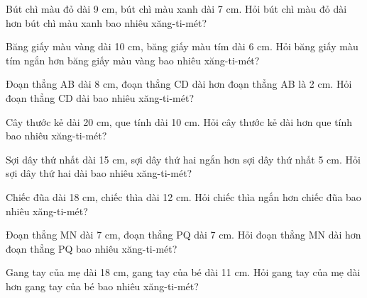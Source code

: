 \begin{ex}
Bút chì màu đỏ dài 9 cm, bút chì màu xanh dài 7 cm. Hỏi bút chì màu đỏ dài hơn bút chì màu xanh bao nhiêu xăng-ti-mét?
\end{ex}

\begin{ex}
Băng giấy màu vàng dài 10 cm, băng giấy màu tím dài 6 cm. Hỏi băng giấy màu tím ngắn hơn băng giấy màu vàng bao nhiêu xăng-ti-mét?
\end{ex}

\begin{ex}
Đoạn thẳng AB dài 8 cm, đoạn thẳng CD dài hơn đoạn thẳng AB là 2 cm. Hỏi đoạn thẳng CD dài bao nhiêu xăng-ti-mét?
\end{ex}

\begin{ex}
Cây thước kẻ dài 20 cm, que tính dài 10 cm. Hỏi cây thước kẻ dài hơn que tính bao nhiêu xăng-ti-mét?
\end{ex}

\begin{ex}
Sợi dây thứ nhất dài 15 cm, sợi dây thứ hai ngắn hơn sợi dây thứ nhất 5 cm. Hỏi sợi dây thứ hai dài bao nhiêu xăng-ti-mét?
\end{ex}

\begin{ex}
Chiếc đũa dài 18 cm, chiếc thìa dài 12 cm. Hỏi chiếc thìa ngắn hơn chiếc đũa bao nhiêu xăng-ti-mét?
\end{ex}

\begin{ex}
Đoạn thẳng MN dài 7 cm, đoạn thẳng PQ dài 7 cm. Hỏi đoạn thẳng MN dài hơn đoạn thẳng PQ bao nhiêu xăng-ti-mét?
\end{ex}

\begin{ex}
Gang tay của mẹ dài 18 cm, gang tay của bé dài 11 cm. Hỏi gang tay của mẹ dài hơn gang tay của bé bao nhiêu xăng-ti-mét?
\end{ex}

